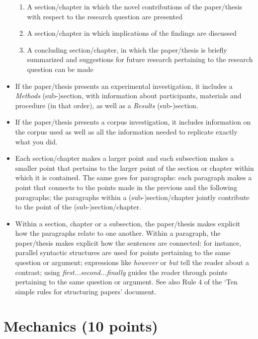 \documentclass[11pt,fleqn,a4paper/thesis]{article}
\newcommand{\6}{\mbox{$[\hspace*{-.6mm}[$}}
\newcommand{\9}{\mbox{$]\hspace*{-.6mm}]$}}
\begin{document}
\begin{itemize}[itemsep=-1pt,leftmargin=2.5ex,topsep=-2pt]
\begin{enumerate}[itemsep=-1pt,leftmargin=3.5ex,topsep=-2pt]
\item A section/chapter in which the novel contributions of the paper/thesis with respect to the research question are presented

\item A section/chapter in which implications of the findings are discussed 

\item A concluding section/chapter, in which the paper/thesis is briefly summarized and suggestions for future research pertaining to the research question can be made

\end{enumerate}

\item If the paper/thesis presents an experimental investigation, it includes a {\em Methods} (sub-)section, with information about participants, materials and procedure (in that order), as well as a {\em Results} (sub-)section. 

\item If the paper/thesis presents a corpus investigation, it includes information on the corpus used as well as all the information needed to replicate exactly what you did.

\item Each section/chapter makes a larger point and each subsection makes a smaller point that pertains to the larger point of the section or chapter within
which it is contained. The same goes for paragraphs: each paragraph makes a point that connects to the points made in the previous and the following
paragraphs; the paragraphs within a (sub-)section/chapter jointly contribute to the point of the (sub-)section/chapter.

\item Within a section, chapter or a subsection, the paper/thesis makes explicit how the paragraphs relate to one another. Within a paragraph, the paper/thesis makes explicit how the sentences are connected: for instance, parallel syntactic structures are used for points pertaining to the same question or argument; expressions like {\em however} or {\em but} tell the reader about a contrast; using {\em first...second...finally} guides the reader through points pertaining to the same question or argument. See also Rule 4 of the `Ten simple rules for structuring papers' document.

\end{itemize}

\section{Mechanics (10 points)}
\end{document}
